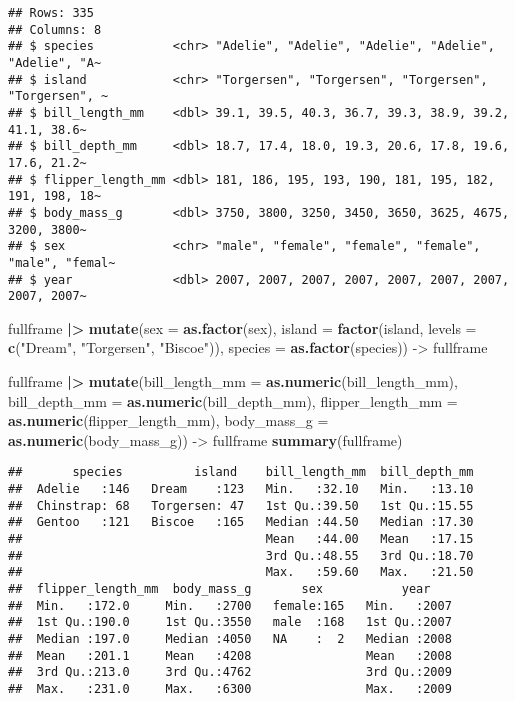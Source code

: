 \documentclass[
]{article}
\newenvironment{Shaded}{\begin{snugshade}}{\end{snugshade}}
\newcommand{\AttributeTok}[1]{\textcolor[rgb]{0.13,0.29,0.53}{#1}}
\newcommand{\FunctionTok}[1]{\textcolor[rgb]{0.13,0.29,0.53}{\textbf{#1}}}
\newcommand{\NormalTok}[1]{#1}
\newcommand{\OtherTok}[1]{\textcolor[rgb]{0.56,0.35,0.01}{#1}}
\newcommand{\SpecialCharTok}[1]{\textcolor[rgb]{0.81,0.36,0.00}{\textbf{#1}}}
\newcommand{\StringTok}[1]{\textcolor[rgb]{0.31,0.60,0.02}{#1}}
\begin{document}
\begin{verbatim}
## Rows: 335
## Columns: 8
## $ species           <chr> "Adelie", "Adelie", "Adelie", "Adelie", "Adelie", "A~
## $ island            <chr> "Torgersen", "Torgersen", "Torgersen", "Torgersen", ~
## $ bill_length_mm    <dbl> 39.1, 39.5, 40.3, 36.7, 39.3, 38.9, 39.2, 41.1, 38.6~
## $ bill_depth_mm     <dbl> 18.7, 17.4, 18.0, 19.3, 20.6, 17.8, 19.6, 17.6, 21.2~
## $ flipper_length_mm <dbl> 181, 186, 195, 193, 190, 181, 195, 182, 191, 198, 18~
## $ body_mass_g       <dbl> 3750, 3800, 3250, 3450, 3650, 3625, 4675, 3200, 3800~
## $ sex               <chr> "male", "female", "female", "female", "male", "femal~
## $ year              <dbl> 2007, 2007, 2007, 2007, 2007, 2007, 2007, 2007, 2007~
\end{verbatim}

\begin{Shaded}
\begin{Highlighting}[]
\NormalTok{fullframe }\SpecialCharTok{|\textgreater{}} 
  \FunctionTok{mutate}\NormalTok{(}\AttributeTok{sex =} \FunctionTok{as.factor}\NormalTok{(sex),}
         \AttributeTok{island =} \FunctionTok{factor}\NormalTok{(island, }\AttributeTok{levels =} \FunctionTok{c}\NormalTok{(}\StringTok{"Dream"}\NormalTok{, }\StringTok{"Torgersen"}\NormalTok{, }\StringTok{"Biscoe"}\NormalTok{)),}
         \AttributeTok{species =} \FunctionTok{as.factor}\NormalTok{(species)) }\OtherTok{{-}\textgreater{}}\NormalTok{ fullframe}


\NormalTok{fullframe }\SpecialCharTok{|\textgreater{}}
  \FunctionTok{mutate}\NormalTok{(}\AttributeTok{bill\_length\_mm =} \FunctionTok{as.numeric}\NormalTok{(bill\_length\_mm),}
         \AttributeTok{bill\_depth\_mm =} \FunctionTok{as.numeric}\NormalTok{(bill\_depth\_mm),}
         \AttributeTok{flipper\_length\_mm =} \FunctionTok{as.numeric}\NormalTok{(flipper\_length\_mm),}
         \AttributeTok{body\_mass\_g =} \FunctionTok{as.numeric}\NormalTok{(body\_mass\_g)) }\OtherTok{{-}\textgreater{}}\NormalTok{ fullframe}
\FunctionTok{summary}\NormalTok{(fullframe)}
\end{Highlighting}
\end{Shaded}

\begin{verbatim}
##       species          island    bill_length_mm  bill_depth_mm  
##  Adelie   :146   Dream    :123   Min.   :32.10   Min.   :13.10  
##  Chinstrap: 68   Torgersen: 47   1st Qu.:39.50   1st Qu.:15.55  
##  Gentoo   :121   Biscoe   :165   Median :44.50   Median :17.30  
##                                  Mean   :44.00   Mean   :17.15  
##                                  3rd Qu.:48.55   3rd Qu.:18.70  
##                                  Max.   :59.60   Max.   :21.50  
##  flipper_length_mm  body_mass_g       sex           year     
##  Min.   :172.0     Min.   :2700   female:165   Min.   :2007  
##  1st Qu.:190.0     1st Qu.:3550   male  :168   1st Qu.:2007  
##  Median :197.0     Median :4050   NA    :  2   Median :2008  
##  Mean   :201.1     Mean   :4208                Mean   :2008  
##  3rd Qu.:213.0     3rd Qu.:4762                3rd Qu.:2009  
##  Max.   :231.0     Max.   :6300                Max.   :2009
\end{verbatim}
\end{document}

